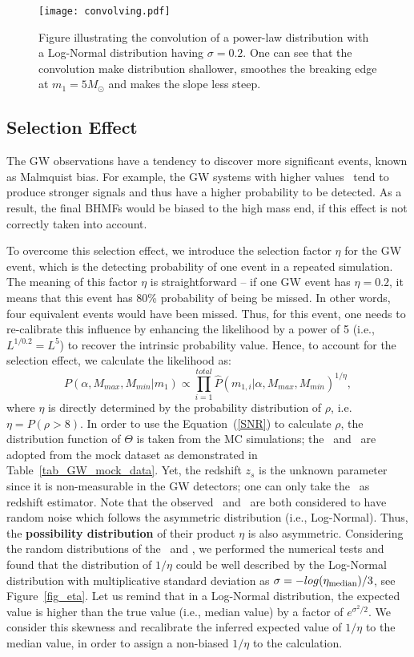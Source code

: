 \documentclass[twocolumn]{aastex62}
\begin{document}
\begin{figure}%
\texttt{[image: convolving.pdf]}
\caption{
Figure illustrating the convolution of a power-law distribution with a Log-Normal distribution having $\sigma = 0.2$. One can see that the convolution make distribution shallower, smoothes the breaking edge at $m_1 = 5 M_{\odot}$ and makes the slope less steep.
}
\label{fig:result_slope}
\end{figure}

\subsection{Selection Effect}\label{sec_likelihood_sf}
The GW observations have a tendency to discover more significant events, known as Malmquist bias. For example, the GW systems with higher values \mone\ tend to produce stronger signals and thus have a higher probability to be detected. As a result, the final BHMFs would be biased to the high mass end, if this effect is not correctly taken into account.

To overcome this selection effect, we introduce the selection factor $\eta$ for the GW event, which is the detecting probability of one event in a repeated simulation. 
The meaning of this factor $\eta$ is straightforward -- if one GW event has $\eta=0.2$, it means that this event has 80\% probability of being be missed. In other words, four equivalent events would have been missed. Thus, for this event, one needs to re-calibrate this influence by enhancing the likelihood by a power of 5 (i.e., $L^{1/0.2} = L^5$) to recover the intrinsic probability value. Hence, to account for the selection effect, we calculate the likelihood as:
 \begin{equation} \label{equ_lik_sf}
 P(\alpha, M_{max}, M_{min}|m_{1}) \propto  \prod_{i=1}^{total} \hat{P}(m_{1,i}|\alpha, M_{max}, M_{min})^{1/\eta},
 \end{equation}
where $\eta$ is directly determined by the probability distribution of $\rho$, i.e. $\eta = P(\rho>8)$. In order to use the Equation~(\ref{SNR}) to calculate $\rho$, the distribution function of $\Theta$ is taken from the MC simulations; the \cmass\ and \dl\ are adopted from the mock dataset as demonstrated in Table~\ref{tab_GW_mock_data}. Yet, the redshift $z_s$ is the unknown parameter since it is non-measurable in the GW detectors; one can only take the \dl\ as redshift estimator.
Note that the observed \dl\ and \cmass\ are both considered to have random noise which follows the asymmetric distribution (i.e., Log-Normal). Thus, the {\bf possibility distribution} of their product $\eta$ is also asymmetric. Considering the random distributions of the \dl\ and \cmass, we performed the numerical tests and found that the distribution of $1/\eta$ could be well described by the Log-Normal distribution with multiplicative standard deviation as $\sigma=-log(\eta_{\rm median})/3$, see Figure~\ref{fig_eta}. Let us remind that in a Log-Normal distribution, the expected value is higher than the true value (i.e., median value) by a factor of $e^{\sigma^2/2}$.
We consider this skewness and recalibrate the inferred expected value of $1/\eta$ to the median value, in order to assign a non-biased $1/\eta$ to the calculation.
\end{document}
